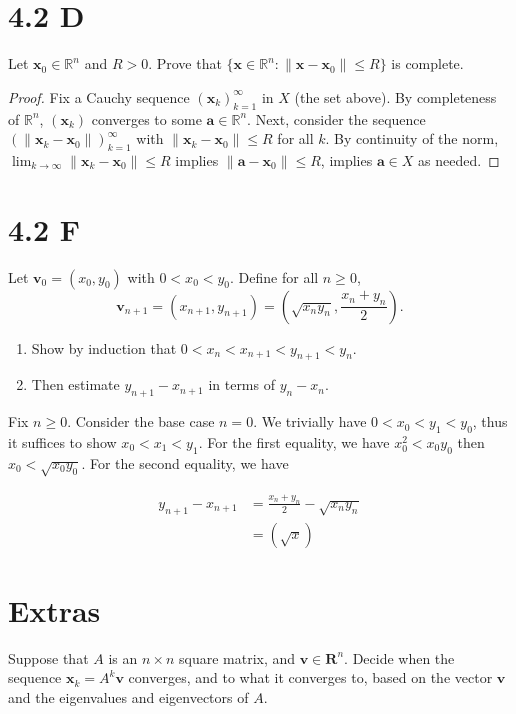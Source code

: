 \documentclass[../main.tex]{subfiles}
\begin{document}
\section{4.2 D}
\begin{problem}
Let $\mathbf{x}_0 \in \mathbb{R}^n$ and $R > 0$.
Prove that $\{ \mathbf{x} \in \mathbb{R}^n : \|\mathbf{x} - \mathbf{x}_0\| \le R \}$ is complete.
\end{problem}
\begin{proof}
	Fix a Cauchy sequence $(\mathbf{x}_k)_{k = 1}^\infty$ in $X$ (the set above).
	By completeness of $\mathbb{R}^n$, $(\mathbf{x}_k)$ converges to some $\mathbf{a} \in \mathbb{R}^n$.
	Next, consider the sequence $(\| \mathbf{x}_k - \mathbf{x}_0 \|)_{k = 1}^\infty$ with $\| \mathbf{x}_k - \mathbf{x}_0 \| \le R$ for all $k$.
	By continuity of the norm, $\lim_{k \to \infty} \| \mathbf{x}_k - \mathbf{x}_0 \| \le R$ implies $\| \mathbf{a} - \mathbf{x}_0 \| \le R$, implies $\mathbf{a} \in X$ as needed.
\end{proof}

\section{4.2 F}
\begin{problem}
Let $\mathbf{v}_0 = (x_0, y_0)$ with $0 < x_0 < y_0$.
Define for all $n \ge 0$,
\[
	\mathbf{v}_{n + 1} = (x_{n + 1}, y_{n + 1}) = \left(\sqrt{x_n y_n}, \frac{x_n + y_n}{2}\right).
\]
\begin{enumerate}[label=(\alph*)]
	\item Show by induction that $0 < x_n < x_{n + 1} < y_{n + 1} < y_n$.
	\item Then estimate $y_{n + 1} - x_{n + 1}$ in terms of $y_n - x_n$.
\end{enumerate}
\end{problem}
Fix $n \ge 0$.
Consider the base case $n = 0$.
We trivially have $0 < x_0 < y_1 < y_0$, thus it suffices to show $x_0 < x_1 < y_1$.
For the first equality, we have $x_0^2 < x_0 y_0$ then $x_0 < \sqrt{x_0 y_0}$.
For the second equality, we have

\begin{align*}
	y_{n + 1} - x_{n + 1} & = \frac{x_n + y_n}{2} - \sqrt{x_n y_n} \\
	                      & = (\sqrt{x} )
\end{align*}

\section{Extras}
\begin{problem}
Suppose that $A$ is an $n \times n$ square matrix, and $\mathbf{v} \in \mathbf{R}^n$.
Decide when the sequence $\mathbf{x}_k = A^k\mathbf{v}$ converges, and to what it converges to, based on the vector $\mathbf{v}$ and the eigenvalues and eigenvectors of $A$.
\end{problem}
\end{document}

